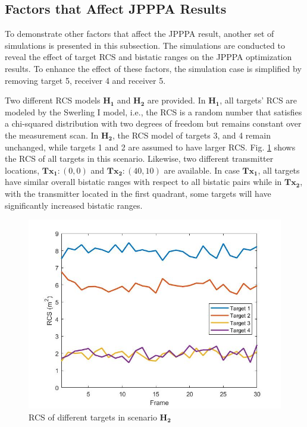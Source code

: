\documentclass[12pt,journal,draftclsnofoot,onecolumn]{IEEEtran}
\begin{document}
\subsection{Factors that Affect JPPPA Results}
To demonstrate other factors that affect the JPPPA result, another set of simulations is presented in this subsection. The simulations are conducted to reveal the effect of target RCS and bistatic ranges on the JPPPA optimization results. To enhance the effect of these factors, the simulation case is simplified by removing target 5, receiver 4 and receiver 5. 

Two different RCS models $\mathbf{H_1}$ and $\mathbf{H_2}$ are provided. In $\mathbf{H_1}$, all targets' RCS are modeled by the Swerling I model, i.e., the RCS is a random number that satisfies a chi-squared distribution with two degrees of freedom but remains constant over the measurement scan. In $\mathbf{H_2}$, the RCS model of targets 3, and 4 remain unchanged, while targets 1 and 2 are assumed to have larger RCS. Fig. \ref{fig:RCS} shows the RCS of all targets in this scenario. Likewise, two different transmitter locations, ${\mathbf{Tx_1}}: (0,0)$ and $\mathbf{Tx_2}:(40,10)$ are available. In case $\mathbf{Tx_1}$, all targets have similar overall bistatic ranges with respect to all bistatic pairs while in $\mathbf{Tx_2}$, with the transmitter located in the first quadrant, some targets will have significantly increased bistatic ranges.

\begin{figure}
	\centering
	\includegraphics[scale=0.36]{RCS.jpg}
	\caption{RCS of different targets in scenario $\mathbf{H_2}$}
	\label{fig:RCS}
\end{figure}
\end{document}
